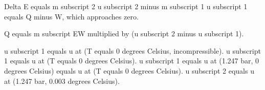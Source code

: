 Delta E equals m subscript 2 u subscript 2 minus m subscript 1 u subscript 1 equals Q minus W, which approaches zero.  

Q equals m subscript EW multiplied by (u subscript 2 minus u subscript 1).  

u subscript 1 equals u at (T equals 0 degrees Celsius, incompressible).  
u subscript 1 equals u at (T equals 0 degrees Celsius).  
u subscript 1 equals u at (1.247 bar, 0 degrees Celsius) equals u at (T equals 0 degrees Celsius).  
u subscript 2 equals u at (1.247 bar, 0.003 degrees Celsius).